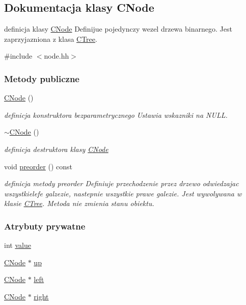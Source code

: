 \hypertarget{class_c_node}{}\subsection{Dokumentacja klasy C\+Node}
\label{class_c_node}


definicja klasy \hyperlink{class_c_node}{C\+Node} Definijue pojedynczy wezel drzewa binarnego. Jest zaprzyjazniona z klasa \hyperlink{class_c_tree}{C\+Tree}.  




{\ttfamily \#include $<$node.\+hh$>$}

\subsubsection*{Metody publiczne}
\begin{DoxyCompactItemize}
\item 
\hyperlink{class_c_node_a92f7b783eb6349154976e1f8229898a5}{C\+Node} ()
\begin{DoxyCompactList}\small\item\em definicja konstruktora bezparametrycznego Ustawia wskazniki na N\+U\+L\+L. \end{DoxyCompactList}\item 
\hyperlink{class_c_node_ac9b30cb93e91a48dacc58821abfc44f0}{$\sim$\+C\+Node} ()
\begin{DoxyCompactList}\small\item\em definicja destruktora klasy \hyperlink{class_c_node}{C\+Node} \end{DoxyCompactList}\item 
void \hyperlink{class_c_node_a219ec84bd6f07c86e6f57c81a1224bcd}{preorder} () const 
\begin{DoxyCompactList}\small\item\em definicja metody preorder Definiuje przechodzenie przez drzewo odwiedzajac wszystkielefe galzezie, nastepnie wszystkie prawe galezie. Jest wywolywana w klasie \hyperlink{class_c_tree}{C\+Tree}. Metoda nie zmienia stanu obiektu. \end{DoxyCompactList}\end{DoxyCompactItemize}
\subsubsection*{Atrybuty prywatne}
\begin{DoxyCompactItemize}
\item 
int \hyperlink{class_c_node_ad08aa99402f6cfbbb9d9580d1f001441}{value}
\item 
\hyperlink{class_c_node}{C\+Node} $\ast$ \hyperlink{class_c_node_a486e2a7c35852d9e93f9b91af687697b}{up}
\item 
\hyperlink{class_c_node}{C\+Node} $\ast$ \hyperlink{class_c_node_a11360164aacc04d65f54860e98116e2f}{left}
\item 
\hyperlink{class_c_node}{C\+Node} $\ast$ \hyperlink{class_c_node_ac2fe09b3646c8a3ee913b2cfd5ab240a}{right}
\end{DoxyCompactItemize}
